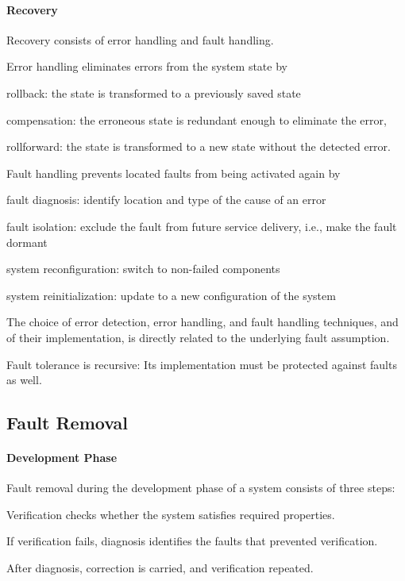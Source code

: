 \paragraph{Recovery}
Recovery consists of error handling and fault handling.

Error handling eliminates errors from the system state by
\begin{compactitem}
  \item rollback: the state is transformed to a previously saved state
  \item compensation: the erroneous state is redundant enough to eliminate the error,
  \item rollforward: the state is transformed to a new state without the detected error.
\end{compactitem}

Fault handling prevents located faults from being activated again by
\begin{compactitem}
  \item fault diagnosis: identify location and type of the cause of an error
  \item fault isolation: exclude the fault from future service delivery, i.e., make the fault dormant
  \item system reconfiguration: switch to non-failed components
  \item system reinitialization: update to a new configuration of the system
\end{compactitem}

The choice of error detection, error handling, and fault handling techniques, and of their implementation, is directly related to the underlying fault assumption.

Fault tolerance is recursive: Its implementation must be protected against faults as well.


\subsection{Fault Removal}

\paragraph{Development Phase}
Fault removal during the development phase of a system consists of three steps:
\begin{compactitem}
 \item Verification checks whether the system satisfies required properties.
 \item If verification fails, diagnosis identifies the faults that prevented verification.
 \item After diagnosis, correction is carried, and verification repeated.
\end{compactitem}

